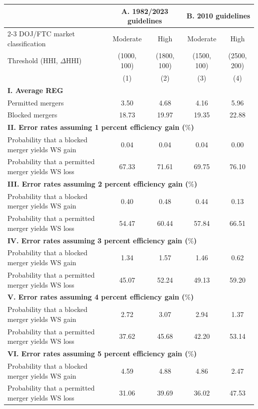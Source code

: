 \begin{tabular}{l @{\hspace{1em}} cc @{\hspace{3em}} cc}
\toprule
 & \multicolumn{2}{c}{\textbf{A. 1982/2023 guidelines}} & \multicolumn{2}{c}{\textbf{B. 2010 guidelines}} \\ 
\cmidrule{2-3}
\cmidrule{4-5}
DOJ/FTC market classification & Moderate & High & Moderate & High \\ 
Threshold (HHI, $\Delta$HHI) & (1000,  100) & (1800, 100) & (1500, 100) & (2500, 200) \\ 
 & (1) & (2) & (3) & (4) \\ 
\midrule
\multicolumn{5}{l}{\textbf{I. Average REG}} \\ 
Permitted mergers & 3.50 & 4.68 & 4.16 & 5.96 \\ 
Blocked mergers & 18.73 & 19.97 & 19.35 & 22.88 \\ 
\midrule
\multicolumn{5}{l}{\textbf{II. Error rates assuming 1 percent efficiency gain ($\%$)}} \\ 
Probability that a blocked merger yields WS gain & 0.04 & 0.04 & 0.04 & 0.00 \\ 
Probability that a permitted merger yields WS loss & 67.33 & 71.61 & 69.75 & 76.10 \\ 
\midrule
\multicolumn{5}{l}{\textbf{III. Error rates assuming 2 percent efficiency gain ($\%$)}} \\ 
Probability that a blocked merger yields WS gain & 0.40 & 0.48 & 0.44 & 0.13 \\ 
Probability that a permitted merger yields WS loss & 54.47 & 60.44 & 57.84 & 66.51 \\ 
\midrule
\multicolumn{5}{l}{\textbf{IV. Error rates assuming 3 percent efficiency gain ($\%$)}} \\ 
Probability that a blocked merger yields WS gain & 1.34 & 1.57 & 1.46 & 0.62 \\ 
Probability that a permitted merger yields WS loss & 45.07 & 52.24 & 49.13 & 59.20 \\ 
\midrule
\multicolumn{5}{l}{\textbf{V. Error rates assuming 4 percent efficiency gain ($\%$)}} \\ 
Probability that a blocked merger yields WS gain & 2.72 & 3.07 & 2.94 & 1.37 \\ 
Probability that a permitted merger yields WS loss & 37.62 & 45.68 & 42.20 & 53.14 \\ 
\midrule
\multicolumn{5}{l}{\textbf{VI. Error rates assuming 5 percent efficiency gain ($\%$)}} \\ 
Probability that a blocked merger yields WS gain & 4.59 & 4.88 & 4.86 & 2.47 \\ 
Probability that a permitted merger yields WS loss & 31.06 & 39.69 & 36.02 & 47.53 \\ 
\bottomrule 
\end{tabular}